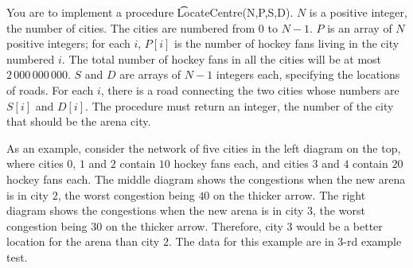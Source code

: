 You are to implement a procedure \t{LocateCentre(N,P,S,D)}. $N$ is a positive integer,
the number of cities. The cities are numbered from $0$ to $N-1$. $P$ is an array of $N$
positive integers; for each $i$, $P[i]$ is the number of hockey fans living in the city
numbered $i$. The total number of hockey fans in all the cities will be at most
$2\,000\,000\,000$. $S$ and $D$ are arrays of $N-1$ integers each, specifying the locations of  roads. For each $i$, there is a road connecting the two cities whose numbers are $S[i]$ and $D[i]$. The procedure must return an integer, the number of the city that should be the arena city.


As an example, consider the network of five cities in the left diagram on the top,
where cities $0$, $1$ and $2$ contain $10$ hockey fans each, and cities $3$ and $4$ contain $20$
hockey fans each. The middle diagram shows the congestions when the new arena is
in city $2$, the worst congestion being $40$ on the thicker arrow. The right diagram
shows the congestions when the new arena is in city $3$, the worst congestion being $30$
on the thicker arrow. Therefore, city $3$ would be a better location for the arena than
city $2$. The data for this example are in 3-rd example test.